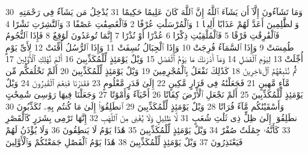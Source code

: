 {\tiny\colorbox{cl_aya}{30}} وَمَا تَشَآءُونَ إِلَّآ أَن يَشَآءَ ٱللَّهُ إِنَّ ٱللَّهَ كَانَ عَلِيمًا حَكِيمًا
{\tiny\colorbox{cl_aya}{31}} يُدْخِلُ مَن يَشَآءُ فِى رَحْمَتِهِۦ وَٱلظَّٰلِمِينَ أَعَدَّ لَهُمْ عَذَابًا أَلِيمًۢا
{\tiny\colorbox{cl_aya}{1}} وَٱلْمُرْسَلَٰتِ عُرْفًا
{\tiny\colorbox{cl_aya}{2}} فَٱلْعَٰصِفَٰتِ عَصْفًا
{\tiny\colorbox{cl_aya}{3}} وَٱلنَّٰشِرَٰتِ نَشْرًا
{\tiny\colorbox{cl_aya}{4}} فَٱلْفَٰرِقَٰتِ فَرْقًا
{\tiny\colorbox{cl_aya}{5}} فَٱلْمُلْقِيَٰتِ ذِكْرًا
{\tiny\colorbox{cl_aya}{6}} عُذْرًا أَوْ نُذْرًا
{\tiny\colorbox{cl_aya}{7}} إِنَّمَا تُوعَدُونَ لَوَٰقِعٌ
{\tiny\colorbox{cl_aya}{8}} فَإِذَا ٱلنُّجُومُ طُمِسَتْ
{\tiny\colorbox{cl_aya}{9}} وَإِذَا ٱلسَّمَآءُ فُرِجَتْ
{\tiny\colorbox{cl_aya}{10}} وَإِذَا ٱلْجِبَالُ نُسِفَتْ
{\tiny\colorbox{cl_aya}{11}} وَإِذَا ٱلرُّسُلُ أُقِّتَتْ
{\tiny\colorbox{cl_aya}{12}} لِأَىِّ يَوْمٍ أُجِّلَتْ
{\tiny\colorbox{cl_aya}{13}} لِيَوْمِ ٱلْفَصْلِ
{\tiny\colorbox{cl_aya}{14}} وَمَآ أَدْرَىٰكَ مَا يَوْمُ ٱلْفَصْلِ
{\tiny\colorbox{cl_aya}{15}} وَيْلٌ يَوْمَئِذٍ لِّلْمُكَذِّبِينَ
{\tiny\colorbox{cl_aya}{16}} أَلَمْ نُهْلِكِ ٱلْأَوَّلِينَ
{\tiny\colorbox{cl_aya}{17}} ثُمَّ نُتْبِعُهُمُ ٱلْءَاخِرِينَ
{\tiny\colorbox{cl_aya}{18}} كَذَٰلِكَ نَفْعَلُ بِٱلْمُجْرِمِينَ
{\tiny\colorbox{cl_aya}{19}} وَيْلٌ يَوْمَئِذٍ لِّلْمُكَذِّبِينَ
{\tiny\colorbox{cl_aya}{20}} أَلَمْ نَخْلُقكُّم مِّن مَّآءٍ مَّهِينٍ
{\tiny\colorbox{cl_aya}{21}} فَجَعَلْنَٰهُ فِى قَرَارٍ مَّكِينٍ
{\tiny\colorbox{cl_aya}{22}} إِلَىٰ قَدَرٍ مَّعْلُومٍ
{\tiny\colorbox{cl_aya}{23}} فَقَدَرْنَا فَنِعْمَ ٱلْقَٰدِرُونَ
{\tiny\colorbox{cl_aya}{24}} وَيْلٌ يَوْمَئِذٍ لِّلْمُكَذِّبِينَ
{\tiny\colorbox{cl_aya}{25}} أَلَمْ نَجْعَلِ ٱلْأَرْضَ كِفَاتًا
{\tiny\colorbox{cl_aya}{26}} أَحْيَآءً وَأَمْوَٰتًا
{\tiny\colorbox{cl_aya}{27}} وَجَعَلْنَا فِيهَا رَوَٰسِىَ شَٰمِخَٰتٍ وَأَسْقَيْنَٰكُم مَّآءً فُرَاتًا
{\tiny\colorbox{cl_aya}{28}} وَيْلٌ يَوْمَئِذٍ لِّلْمُكَذِّبِينَ
{\tiny\colorbox{cl_aya}{29}} ٱنطَلِقُوٓا۟ إِلَىٰ مَا كُنتُم بِهِۦ تُكَذِّبُونَ
{\tiny\colorbox{cl_aya}{30}} ٱنطَلِقُوٓا۟ إِلَىٰ ظِلٍّ ذِى ثَلَٰثِ شُعَبٍ
{\tiny\colorbox{cl_aya}{31}} لَّا ظَلِيلٍ وَلَا يُغْنِى مِنَ ٱللَّهَبِ
{\tiny\colorbox{cl_aya}{32}} إِنَّهَا تَرْمِى بِشَرَرٍ كَٱلْقَصْرِ
{\tiny\colorbox{cl_aya}{33}} كَأَنَّهُۥ جِمَٰلَتٌ صُفْرٌ
{\tiny\colorbox{cl_aya}{34}} وَيْلٌ يَوْمَئِذٍ لِّلْمُكَذِّبِينَ
{\tiny\colorbox{cl_aya}{35}} هَٰذَا يَوْمُ لَا يَنطِقُونَ
{\tiny\colorbox{cl_aya}{36}} وَلَا يُؤْذَنُ لَهُمْ فَيَعْتَذِرُونَ
{\tiny\colorbox{cl_aya}{37}} وَيْلٌ يَوْمَئِذٍ لِّلْمُكَذِّبِينَ
{\tiny\colorbox{cl_aya}{38}} هَٰذَا يَوْمُ ٱلْفَصْلِ جَمَعْنَٰكُمْ وَٱلْأَوَّلِينَ
